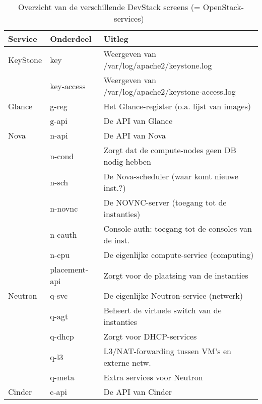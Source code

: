 \begin{appendices}
\begin{table}[H]
 	\centering
 	\caption*{Overzicht van de verschillende DevStack screens (= OpenStack-services)~\cite{Kumar2017}}
 	\label{my-label}
 	\begin{tabular}{lll}
 		\hline
 		Service    & Onderdeel                  & Uitleg                                             \\ \hline
 		KeyStone   & key                        & Weergeven van /var/log/apache2/keystone.log        \\
 		& key-access                 & Weergeven van /var/log/apache2/keystone-access.log \\ \hline
 		Glance     & g-reg                      & Het Glance-register (o.a. lijst van images)        \\
 		& g-api                      & De API van Glance                                  \\ \hline
 		Nova       & n-api                      & De API van Nova                                    \\
 		& n-cond                     & Zorgt dat de compute-nodes geen DB nodig hebben    \\
 		& n-sch                      & De Nova-scheduler (waar komt nieuwe inst.?)        \\
 		& n-novnc                    & De NOVNC-server (toegang tot de instanties)        \\
 		& n-cauth                    & Console-auth: toegang tot de consoles van de inst. \\
 		& n-cpu                      & De eigenlijke compute-service (computing)          \\
 		& placement-api              & Zorgt voor de plaatsing van de instanties          \\ \hline
 		Neutron    & q-svc                      & De eigenlijke Neutron-service (netwerk)            \\
 		& q-agt                      & Beheert de virtuele switch van de instanties       \\
 		& q-dhcp                     & Zorgt voor DHCP-services                           \\
 		& q-l3                       & L3/NAT-forwarding tussen VM's en externe netw.     \\
 		& q-meta                     & Extra services voor Neutron                        \\ \hline
 		Cinder     & c-api                      & De API van Cinder                                  \\

\end{tabular}
\end{table}
\end{appendices}
